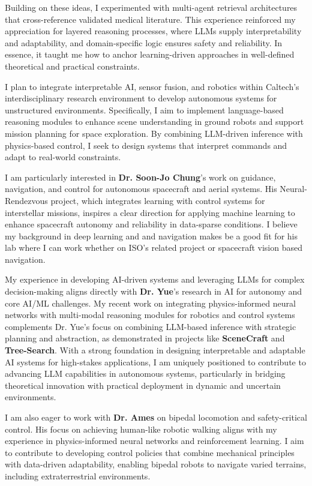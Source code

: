 \documentclass[a4,20pt]{article}
\begin{document}
\begin{large}
Building on these ideas, I experimented with multi-agent retrieval architectures that cross-reference validated medical literature. This experience reinforced my appreciation for layered reasoning processes, where LLMs supply interpretability and adaptability, and domain-specific logic ensures safety and reliability. In essence, it taught me how to anchor learning-driven approaches in well-defined theoretical and practical constraints.

I plan to integrate interpretable AI, sensor fusion, and robotics within Caltech’s interdisciplinary research environment to develop autonomous systems for unstructured environments. Specifically, I aim to implement language-based reasoning modules to enhance scene understanding in ground robots and support mission planning for space exploration. By combining LLM-driven inference with physics-based control, I seek to design systems that interpret commands and adapt to real-world constraints.

I am particularly interested in \textbf{Dr. Soon-Jo Chung}’s work on guidance, navigation, and control for autonomous spacecraft and aerial systems. His Neural-Rendezvous project, which integrates learning with control systems for interstellar missions, inspires a clear direction for applying machine learning to enhance spacecraft autonomy and reliability in data-sparse conditions. I believe my background in deep learning and and navigation makes be a good fit for his lab where I can work whether on ISO's related project or spacecraft vision based navigation.

My experience in developing AI-driven systems and leveraging LLMs for complex decision-making aligns directly with \textbf{Dr. Yue}’s research in AI for autonomy and core AI/ML challenges. My recent work on integrating physics-informed neural networks with multi-modal reasoning modules for robotics and control systems complements Dr. Yue’s focus on combining LLM-based inference with strategic planning and abstraction, as demonstrated in projects like \textbf{SceneCraft} and \textbf{Tree-Search}. With a strong foundation in designing interpretable and adaptable AI systems for high-stakes applications, I am uniquely positioned to contribute to advancing LLM capabilities in autonomous systems, particularly in bridging theoretical innovation with practical deployment in dynamic and uncertain environments.


I am also eager to work with \textbf{Dr. Ames} on bipedal locomotion and safety-critical control. His focus on achieving human-like robotic walking aligns with my experience in physics-informed neural networks and reinforcement learning. I aim to contribute to developing control policies that combine mechanical principles with data-driven adaptability, enabling bipedal robots to navigate varied terrains, including extraterrestrial environments.


\end{large}
\end{document}
